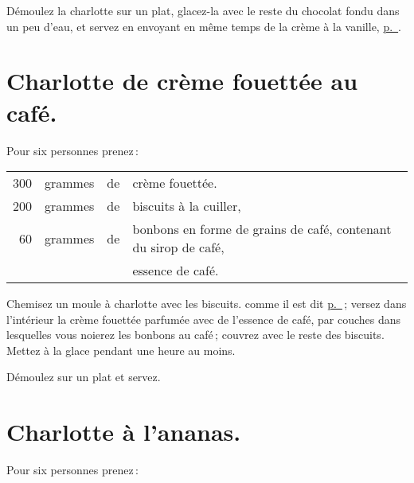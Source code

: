 Démoulez la charlotte sur un plat, glacez-la avec le reste du chocolat fondu
dans un peu d'eau, et servez en envoyant en même temps de la crème à la
vanille, \hyperlink{p0868}{p. \pageref{pg0868}}.

\section*{\centering Charlotte de crème fouettée au café.}
{}

Pour six personnes prenez :

\footnotesize
\begin{longtable}{rrrp{16em}}
    300 & grammes & de & crème fouettée.                                                                  \\
    200 & grammes & de & biscuits à la cuiller,                                                           \\
     60 & grammes & de & bonbons en forme de grains de café, contenant du sirop de café,                  \\
        &         &    & essence de café.                                                                 \\
\end{longtable}
\normalsize


Chemisez un moule à charlotte avec les biscuits. comme il est dit
\hyperlink{p0865}{p. \pageref{pg0865}} ; versez dans l'intérieur la crème fouettée
parfumée avec de l'essence de café, par couches dans lesquelles vous noierez
les bonbons au café ; couvrez avec le reste des biscuits. Mettez à la glace
pendant une heure au moins.

Démoulez sur un plat et servez.

\section*{\centering Charlotte à l'ananas.}
{}

Pour six personnes prenez :

